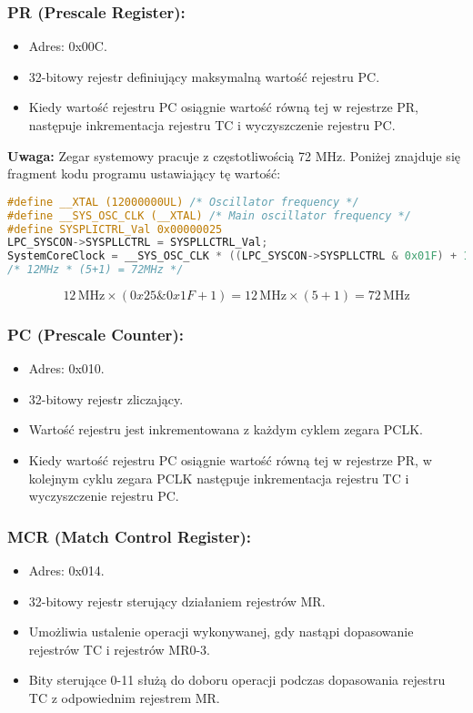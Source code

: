 \documentclass[a4paper,12pt]{report}
\begin{document}
\subsubsection*{PR (Prescale Register):}
\begin{itemize}
    \item Adres: 0x00C.
    \item 32-bitowy rejestr definiujący maksymalną wartość rejestru PC.
    \item Kiedy wartość rejestru PC osiągnie wartość równą tej w rejestrze PR, następuje inkrementacja rejestru TC i wyczyszczenie rejestru PC.
\end{itemize}

\textbf{Uwaga:} Zegar systemowy pracuje z częstotliwością 72 MHz. Poniżej znajduje się fragment kodu programu ustawiający tę wartość:
\begin{lstlisting}[language=C]
#define __XTAL (12000000UL) /* Oscillator frequency */
#define __SYS_OSC_CLK (__XTAL) /* Main oscillator frequency */
#define SYSPLICTRL_Val 0x00000025
LPC_SYSCON->SYSPLLCTRL = SYSPLLCTRL_Val;
SystemCoreClock = __SYS_OSC_CLK * ((LPC_SYSCON->SYSPLLCTRL & 0x01F) + 1);
/* 12MHz * (5+1) = 72MHz */
\end{lstlisting}

\[
12\,\mathrm{MHz} \times (0x25 \& 0x1F + 1) = 12\,\mathrm{MHz} \times (5+1) = 72\,\mathrm{MHz}
\]

\subsubsection*{PC (Prescale Counter):}
\begin{itemize}
    \item Adres: 0x010.
    \item 32-bitowy rejestr zliczający.
    \item Wartość rejestru jest inkrementowana z każdym cyklem zegara PCLK.
    \item Kiedy wartość rejestru PC osiągnie wartość równą tej w rejestrze PR, w kolejnym cyklu zegara PCLK następuje inkrementacja rejestru TC i wyczyszczenie rejestru PC.
\end{itemize}

\subsubsection*{MCR (Match Control Register):}
\begin{itemize}
    \item Adres: 0x014.
    \item 32-bitowy rejestr sterujący działaniem rejestrów MR.
    \item Umożliwia ustalenie operacji wykonywanej, gdy nastąpi dopasowanie rejestrów TC i rejestrów MR0-3.
    \item Bity sterujące 0-11 służą do doboru operacji podczas dopasowania rejestru TC z odpowiednim rejestrem MR.
\end{itemize}
\end{document}
